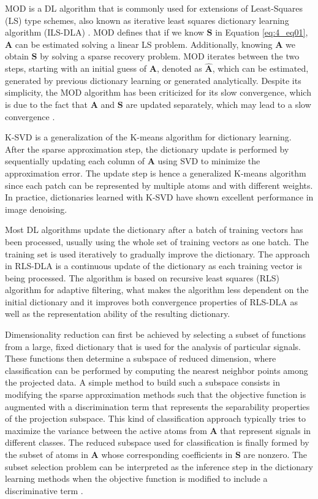 MOD \cite{engan1999method} is a DL algorithm that is commonly used for extensions of Least-Squares (LS) type schemes, also known as iterative least squares dictionary learning algorithm (ILS-DLA) \cite{engan2007family}. MOD defines that if we know $\textbf{S}$ in Equation \ref{eq:4_eq01}, $\textbf{A}$ can be estimated solving a linear LS problem. Additionally, knowing $\textbf{A}$ we obtain $\textbf{S}$ by solving a sparse recovery problem. MOD iterates between the two steps, starting with an initial guess of $\textbf{A}$, denoted as $\hat{\textbf{A}}$, which can be estimated, generated by previous dictionary learning or generated analytically. Despite its simplicity, the MOD algorithm has been criticized for its slow convergence, which is due to the fact that $\textbf{A}$ and $\textbf{S}$ are updated separately, which may lead to a slow convergence \cite{aharon2006rm}.

K-SVD \cite{aharon2006rm} is a generalization of the K-means algorithm for dictionary learning. After the sparse approximation step, the dictionary update is performed by sequentially updating each column of $\textbf{A}$ using SVD to minimize the approximation error. The update step is hence a generalized K-means algorithm since each patch can be represented by multiple atoms and with different weights. In practice, dictionaries learned with K-SVD
have shown excellent performance in image denoising. 

Most DL algorithms update the dictionary after a batch of training vectors has been processed, usually using the whole set of training vectors as one batch. The training set is used iteratively to gradually improve the dictionary. The approach in RLS-DLA \cite{skretting2010recursive} is a continuous update of the dictionary as each training vector is being processed. The algorithm is based on recursive least squares (RLS) algorithm for adaptive filtering, what makes the algorithm less dependent on the initial dictionary and it improves both convergence properties of RLS-DLA as well as the representation ability of the resulting dictionary. 

Dimensionality reduction can first be achieved by selecting a subset of functions from a large, fixed dictionary that is used for the analysis of particular signals. These functions then determine a subspace of reduced dimension, where classification can be performed by computing the nearest neighbor points among the projected data. A simple method to build such a subspace consists in modifying the sparse approximation methods such that the objective function is augmented with a discrimination term that represents the separability properties of the projection subspace. This kind of classification approach typically tries to maximize the variance between the active atoms from $\textbf{A}$ that represent signals in different classes. The reduced subspace used for classification is finally formed by the subset of atoms in $\textbf{A}$ whose corresponding coefficients in $\textbf{S}$ are nonzero. The subset selection problem can be interpreted as the inference step in the dictionary learning methods when the objective function is modified to include a discriminative term \cite{tosic2011dictionary}.

